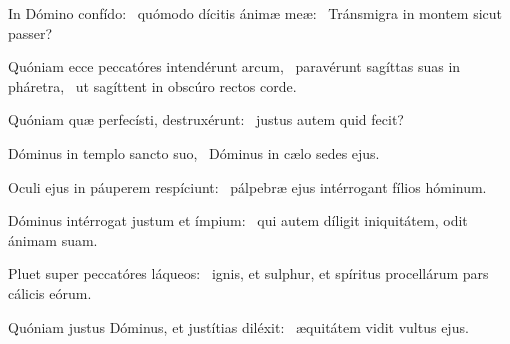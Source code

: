 \item In Dómino confído:~\pscross{} quómodo dícitis ánimæ meæ:~\psstar{} Tránsmigra in montem sicut passer?

\item Quóniam ecce peccatóres intendérunt arcum,~\pscross{} paravérunt sagíttas suas in pháretra,~\psstar{} ut sagíttent in obscúro rectos corde.

\item Quóniam quæ perfecísti, destruxérunt:~\psstar{} justus autem quid fecit?

\item Dóminus in templo sancto suo,~\psstar{} Dóminus in cælo sedes ejus.

\item Oculi ejus in páuperem respíciunt:~\psstar{} pálpebræ ejus intérrogant fílios hóminum.

\item Dóminus intérrogat justum et ímpium:~\psstar{} qui autem díligit iniquitátem, odit ánimam suam.

\item Pluet super peccatóres láqueos:~\psstar{} ignis, et sulphur, et spíritus procellárum pars cálicis eórum.

\item Quóniam justus Dóminus, et justítias diléxit:~\psstar{} æquitátem vidit vultus ejus.


